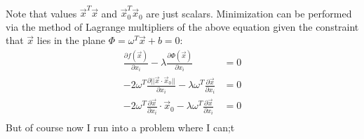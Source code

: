 \documentclass{article}
\newcommand{\1}{\mathbf{1}}
\begin{document}
\begin{enumerate}
\begin{footnotesize}
\begin{align*}
	\end{align*} 
	Note that values $\vec x^T \vec x$ and $\vec x_0^T \vec x_0$ are just scalars. Minimization can be performed via the method of Lagrange multipliers of the above equation given the constraint that $\vec x$ lies in the plane $\Phi = \omega^T\vec x +b =0$:
	\begin{align*}
	    \frac{\partial f(\vec x)}{\partial x_i} - \lambda \frac{\partial \Phi(\vec x)}{\partial x_i} &= 0 \\
	    -2\omega^T\frac{\partial ||\vec x\cdot\vec x_0||}{\partial x_i} - \lambda\omega^T \frac{\partial \vec x}{\partial x_i} &= 0 \\
	    -2\omega^T\frac{\partial \vec x}{\partial x_i}\cdot\vec x_0 - \lambda\omega^T\frac{\partial \vec x}{\partial x_i} &= 0 \\
	\end{align*}
	But of course now I run into a problem where I can;t 
	\end{footnotesize}
\end{enumerate}
\end{document}
